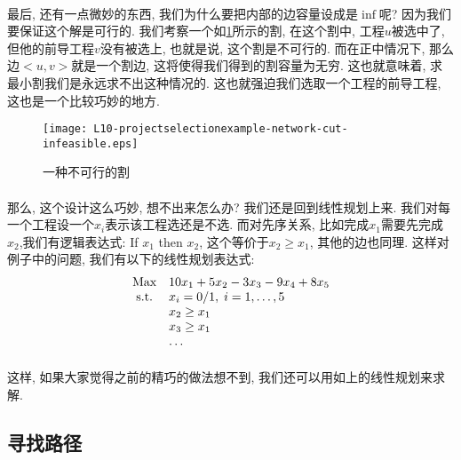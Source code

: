             \paragraph{}最后, 还有一点微妙的东西, 我们为什么要把内部的边容量设成是$\inf$呢? 因为我们要保证这个解是可行的. 我们考察一个如\figurename\ref{Figure: projecgt_selection_example_network_cut_infeasible}所示的割, 在这个割中, 工程$u$被选中了, 但他的前导工程$v$没有被选上, 也就是说, 这个割是不可行的. 而在正中情况下, 那么边$<u,v>$就是一个割边, 这将使得我们得到的割容量为无穷. 这也就意味着, 求最小割我们是永远求不出这种情况的. 这也就强迫我们选取一个工程的前导工程, 这也是一个比较巧妙的地方.
            \begin{figure}[h]
                \centering
                \texttt{[image: L10-projectselectionexample-network-cut-infeasible.eps]}
                \caption{一种不可行的割}
                \label{Figure: projecgt_selection_example_network_cut_infeasible}
            \end{figure}
            \paragraph{}那么, 这个设计这么巧妙, 想不出来怎么办? 我们还是回到线性规划上来. 我们对每一个工程设一个$x_i$表示该工程选还是不选. 而对先序关系, 比如完成$x_1$需要先完成$x_2$,我们有逻辑表达式: If $x_1$ then $x_2$, 这个等价于$x_2 \geq x_1$, 其他的边也同理. 这样对例子中的问题, 我们有以下的线性规划表达式:
            \begin{equation*}
\begin{array}{cl@{}ll}
\text{Max}  & 10x_1 + 5x_2 - 3x_3 - 9 x_4 + 8 x_5 &\\
\text{s.t.} & x_i = 0/1,\; i = 1,\dots,5  &\\
            & x_2 \geq x_1 &  \\
            & x_3 \geq x_1 &  \\
            & \dots
\end{array}
            \end{equation*}
            \paragraph{}这样, 如果大家觉得之前的精巧的做法想不到, 我们还可以用如上的线性规划来求解.

            
            
    \subsection{寻找路径}
